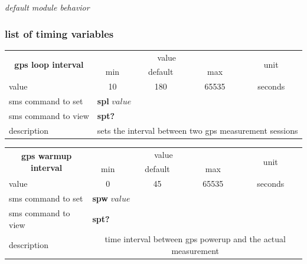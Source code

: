 \documentclass[a4paper,twoside]{refart}
\begin{document}
\begin{table}[ht]
\caption{\em default module behavior}
\label{gsm_diag}
\end{table}


\subsubsection{list of timing variables}

\label{sms:spl}
\begin{tabular}{ |l|c|c|c|c| }
    \hline
    \multicolumn{1}{|c|}{\multirow{2}{*}{\textbf{gps loop interval}}} & \multicolumn{3}{|c|}{value} & \multicolumn{1}{|c|}{\multirow{2}{*}{unit}} \\ \cline{2-4}
    \multicolumn{1}{|c|}{} & min & default & max & \\ \hline
    value & 10 & 180 & 65535 & seconds \\ \hline
    sms command to set & \multicolumn{4}{|l|}{\textbf{spl} $value$} \\ \hline
    sms command to view & \multicolumn{4}{|l|}{\textbf{spt?}} \\ \hline
    description & \multicolumn{4}{|p{7cm}|}{sets the interval between two gps measurement sessions} \\ \hline
\end{tabular}

\label{sms:spw}
\begin{tabular}{ |l|c|c|c|c| }
    \hline
    \multicolumn{1}{|c|}{\multirow{2}{*}{\textbf{gps warmup interval}}} & \multicolumn{3}{|c|}{value} & \multicolumn{1}{|c|}{\multirow{2}{*}{unit}} \\ \cline{2-4}
    \multicolumn{1}{|c|}{} & min & default & max & \\ \hline
    value & 0 & 45 & 65535 & seconds \\ \hline
    sms command to set & \multicolumn{4}{|l|}{\textbf{spw} $value$} \\ \hline
    sms command to view & \multicolumn{4}{|l|}{\textbf{spt?}} \\ \hline
    description & \multicolumn{4}{|p{7cm}|}{time interval between gps powerup and the actual measurement} \\ \hline
\end{tabular}
\end{document}
